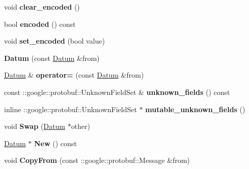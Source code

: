\begin{DoxyCompactItemize}
\mbox{\label{classcaffe_1_1_datum_aa27b32e16eb3b61009c75a20e0ac3a10}} 
void {\bfseries clear\+\_\+encoded} ()
\item 
\mbox{\label{classcaffe_1_1_datum_ac9f09584c5a1936f727bad5ceff2094e}} 
bool {\bfseries encoded} () const
\item 
\mbox{\label{classcaffe_1_1_datum_aa65cdd18b5868026063a85378e6613d5}} 
void {\bfseries set\+\_\+encoded} (bool value)
\item 
\mbox{\label{classcaffe_1_1_datum_a87cf03257728c2a435b74d1eae6f96da}} 
{\bfseries Datum} (const \mbox{\hyperlink{classcaffe_1_1_datum}{Datum}} \&from)
\item 
\mbox{\label{classcaffe_1_1_datum_abe1d05e07b4cdca15457b1d68889b51d}} 
\mbox{\hyperlink{classcaffe_1_1_datum}{Datum}} \& {\bfseries operator=} (const \mbox{\hyperlink{classcaffe_1_1_datum}{Datum}} \&from)
\item 
\mbox{\label{classcaffe_1_1_datum_a54bc1fe5a5f72dfabc42413f06dc389c}} 
const \+::google\+::protobuf\+::\+Unknown\+Field\+Set \& {\bfseries unknown\+\_\+fields} () const
\item 
\mbox{\label{classcaffe_1_1_datum_a5c2e7c405bb72ac9ea64fdd2f909c136}} 
inline \+::google\+::protobuf\+::\+Unknown\+Field\+Set $\ast$ {\bfseries mutable\+\_\+unknown\+\_\+fields} ()
\item 
\mbox{\label{classcaffe_1_1_datum_aae3c7206e0c99909b884089370596eef}} 
void {\bfseries Swap} (\mbox{\hyperlink{classcaffe_1_1_datum}{Datum}} $\ast$other)
\item 
\mbox{\label{classcaffe_1_1_datum_af88a1e73d7f02e2bd6cdab676cbdab66}} 
\mbox{\hyperlink{classcaffe_1_1_datum}{Datum}} $\ast$ {\bfseries New} () const
\item 
\mbox{\label{classcaffe_1_1_datum_a21afb7231c1d1a8b425debd6ad83a499}} 
void {\bfseries Copy\+From} (const \+::google\+::protobuf\+::\+Message \&from)
\item 

\end{DoxyCompactItemize}
